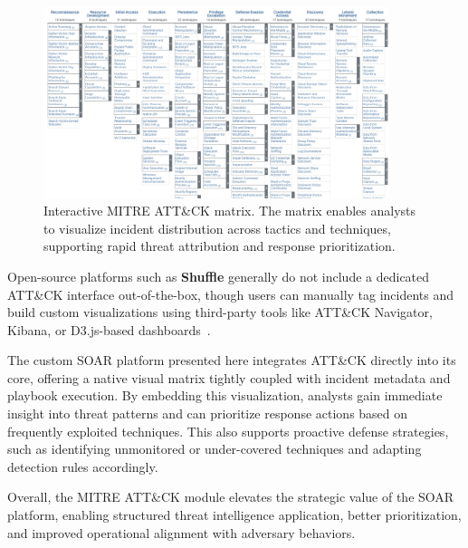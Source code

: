 \begin{figure}[ht]
    \centering
    \includegraphics[width=0.9\textwidth]{images/mitre_att&ck_matrix.png}
    \caption[Interactive MITRE ATT\&CK matrix]{Interactive MITRE ATT\&CK matrix. The matrix enables analysts to visualize incident distribution across tactics and techniques, supporting rapid threat attribution and response prioritization.}
    \label{fig:mitre-attck-matrix}
\end{figure}

Open-source platforms such as \textbf{Shuffle} generally do not include a dedicated ATT\&CK interface out-of-the-box, though users can manually tag incidents and build custom visualizations using third-party tools like ATT\&CK Navigator, Kibana, or D3.js-based dashboards~\cite{techtarget}.

The custom SOAR platform presented here integrates ATT\&CK directly into its core, offering a native visual matrix tightly coupled with incident metadata and playbook execution. By embedding this visualization, analysts gain immediate insight into threat patterns and can prioritize response actions based on frequently exploited techniques. This also supports proactive defense strategies, such as identifying unmonitored or under-covered techniques and adapting detection rules accordingly.

Overall, the MITRE ATT\&CK module elevates the strategic value of the SOAR platform, enabling structured threat intelligence application, better prioritization, and improved operational alignment with adversary behaviors.